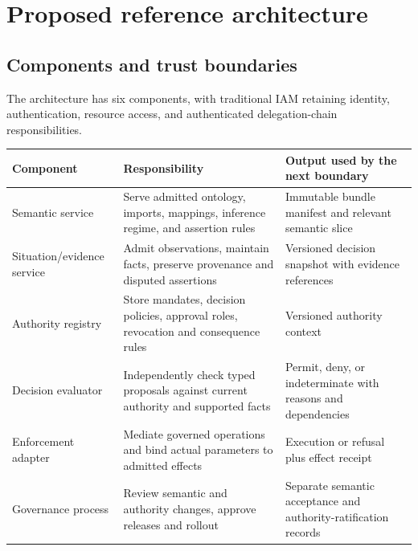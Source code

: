 \documentclass[
  english,
  12pt,
  a4paper,
  preprint,
  numbers,
  nopreprintline]{elsarticle}
\newcounter{none} %
\begin{document}
\section{Proposed reference
architecture}\label{proposed-reference-architecture}

\subsection{Components and trust
boundaries}\label{components-and-trust-boundaries}

The architecture has six components, with traditional IAM retaining
identity, authentication, resource access, and authenticated
delegation-chain responsibilities.

{\def\LTcaptype{none} %
\begin{longtable}[]{@{}
  >{\raggedright\arraybackslash}p{}
  >{\raggedright\arraybackslash}p{}
  >{\raggedright\arraybackslash}p{}@{}}
\toprule\noalign{}
\begin{minipage}[b]{\linewidth}\raggedright
Component
\end{minipage} & \begin{minipage}[b]{\linewidth}\raggedright
Responsibility
\end{minipage} & \begin{minipage}[b]{\linewidth}\raggedright
Output used by the next boundary
\end{minipage} \\
\midrule\noalign{}
\endhead
\bottomrule\noalign{}
\endlastfoot
Semantic service & Serve admitted ontology, imports, mappings, inference
regime, and assertion rules & Immutable bundle manifest and relevant
semantic slice \\
Situation/evidence service & Admit observations, maintain facts,
preserve provenance and disputed assertions & Versioned decision
snapshot with evidence references \\
Authority registry & Store mandates, decision policies, approval roles,
revocation and consequence rules & Versioned authority context \\
Decision evaluator & Independently check typed proposals against current
authority and supported facts & Permit, deny, or indeterminate with
reasons and dependencies \\
Enforcement adapter & Mediate governed operations and bind actual
parameters to admitted effects & Execution or refusal plus effect
receipt \\
Governance process & Review semantic and authority changes, approve
releases and rollout & Separate semantic acceptance and
authority-ratification records \\
\end{longtable}
}
\end{document}
